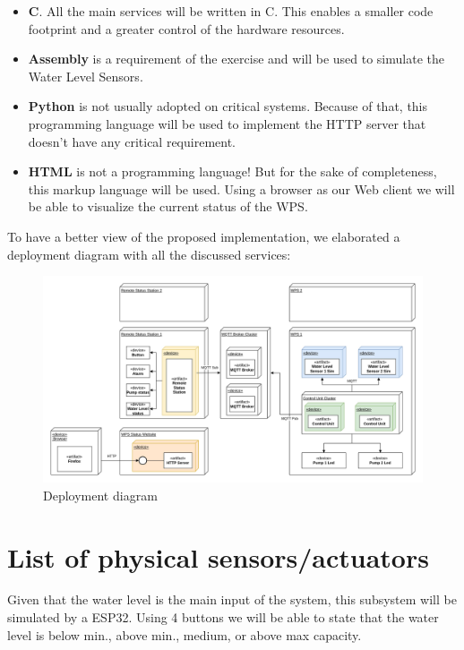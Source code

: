 \documentclass[11pt]{article}
\begin{document}
\begin{itemize}
	\item \textbf{C}. All the main services will be written in C. This enables a smaller code footprint and a greater control of the hardware resources.
	\item \textbf{Assembly} is a requirement of the exercise and will be used to simulate the Water Level Sensors.
	\item \textbf{Python} is not usually adopted on critical systems. Because of that, this programming language will be used to implement the HTTP server that doesn't have any critical requirement.
	\item \textbf{HTML} is not a programming language! But for the sake of completeness, this markup language will be used. Using a browser as our Web client we will be able to visualize the current status of the WPS.
\end{itemize}

To have a better view of the proposed implementation, we elaborated a deployment diagram with all the discussed services:

\begin{figure}[H]
  \centering
  \includegraphics[width=\linewidth]{../diagrams/deployment-diagram-WPS.jpg}
  \caption{Deployment diagram}
  \label{fig:Deployment Diagram}
\end{figure}

\newpage
\section{List of physical sensors/actuators}

Given that the water level is the main input of the system, this subsystem will be simulated by a ESP32. Using 4 buttons we will be able to state that the water level is below min., above min., medium, or above max capacity.
\end{document}
